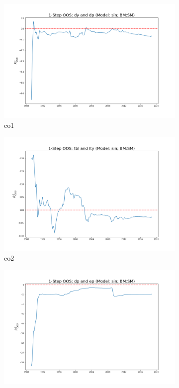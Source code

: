 \documentclass[a4paper,12pt,times,numbered,print,index]{report}
\numberwithin{equation}{section}
\begin{document}
\begin{figure}[!htbp]
	\centering
	\caption{OOS Results for Model with $f_1$}
	\begin{subfigure}[b]{0.42\linewidth}
		\includegraphics[width=0.9\linewidth]{OOS_plots/sin_co1_SM.png}
		\caption{co1}
	\end{subfigure}
	\begin{subfigure}[b]{0.42\linewidth}
		\includegraphics[width=0.9\linewidth]{OOS_plots/sin_co2_SM.png}
		\caption{co2}
	\end{subfigure}
	\begin{subfigure}[b]{0.42\linewidth}
		\includegraphics[width=0.9\linewidth]{OOS_plots/sin_co3_SM.png}

\end{subfigure}
\end{figure}
\end{document}
